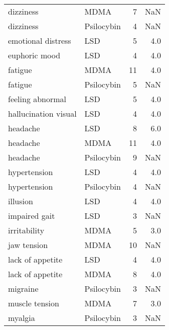 \begin{tabular}{llrr}
                          dizziness &       MDMA &            7 &         NaN \\
                          dizziness & Psilocybin &            4 &         NaN \\
                 emotional distress &        LSD &            5 &         4.0 \\
                      euphoric mood &        LSD &            4 &         4.0 \\
                            fatigue &       MDMA &           11 &         4.0 \\
                            fatigue & Psilocybin &            5 &         NaN \\
                   feeling abnormal &        LSD &            5 &         4.0 \\
               hallucination visual &        LSD &            4 &         4.0 \\
                           headache &        LSD &            8 &         6.0 \\
                           headache &       MDMA &           11 &         4.0 \\
                           headache & Psilocybin &            9 &         NaN \\
                       hypertension &        LSD &            4 &         4.0 \\
                       hypertension & Psilocybin &            4 &         NaN \\
                           illusion &        LSD &            4 &         4.0 \\
                      impaired gait &        LSD &            3 &         NaN \\
                       irritability &       MDMA &            5 &         3.0 \\
                        jaw tension &       MDMA &           10 &         NaN \\
                   lack of appetite &        LSD &            4 &         4.0 \\
                   lack of appetite &       MDMA &            8 &         4.0 \\
                           migraine & Psilocybin &            3 &         NaN \\
                     muscle tension &       MDMA &            7 &         3.0 \\
                            myalgia & Psilocybin &            3 &         NaN \\

\end{tabular}
